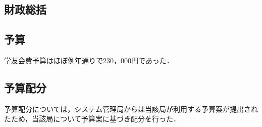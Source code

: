 \subsection*{財政総括}


\subsection*{予算}
学友会費予算はほぼ例年通りで230，000円であった．


\subsection*{予算配分}
予算配分については，システム管理局からは当該局が利用する予算案が提出されたため，当該局について予算案に基づき配分を行った．
